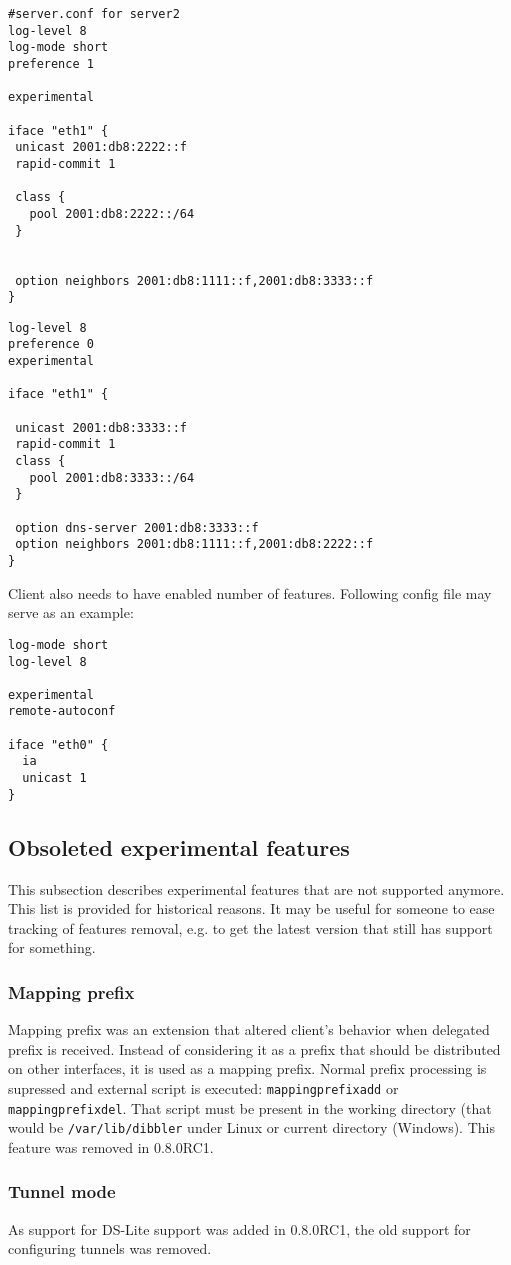 \begin{lstlisting}
#server.conf for server2
log-level 8
log-mode short
preference 1

experimental

iface "eth1" {
 unicast 2001:db8:2222::f
 rapid-commit 1

 class {
   pool 2001:db8:2222::/64
 }


 option neighbors 2001:db8:1111::f,2001:db8:3333::f
}
\end{lstlisting}

\begin{lstlisting}
log-level 8
preference 0
experimental

iface "eth1" {

 unicast 2001:db8:3333::f
 rapid-commit 1
 class {
   pool 2001:db8:3333::/64
 }

 option dns-server 2001:db8:3333::f
 option neighbors 2001:db8:1111::f,2001:db8:2222::f
}
\end{lstlisting}

Client also needs to have enabled number of features. Following config
file may serve as an example:

\begin{lstlisting}
log-mode short
log-level 8

experimental
remote-autoconf

iface "eth0" {
  ia
  unicast 1
}
\end{lstlisting}

\subsection{Obsoleted experimental features}
This subsection describes experimental features that are not supported
anymore. This list is provided for historical reasons. It may be
useful for someone to ease tracking of features removal, e.g. to
get the latest version that still has support for something.

\subsubsection{Mapping prefix}
Mapping prefix was an extension that altered client's behavior when
delegated prefix is received. Instead of considering it as a prefix
that should be distributed on other interfaces, it is used as a mapping
prefix. Normal prefix processing is supressed and external script is
executed: \verb+mappingprefixadd+ or \verb+mappingprefixdel+. That
script must be present in the working directory (that would be
\verb+/var/lib/dibbler+ under Linux or current directory (Windows).
This feature was removed in 0.8.0RC1.

\subsubsection{Tunnel mode}
As support for DS-Lite \cite{rfc6334} support was added in
0.8.0RC1, the old support for configuring tunnels was removed.

